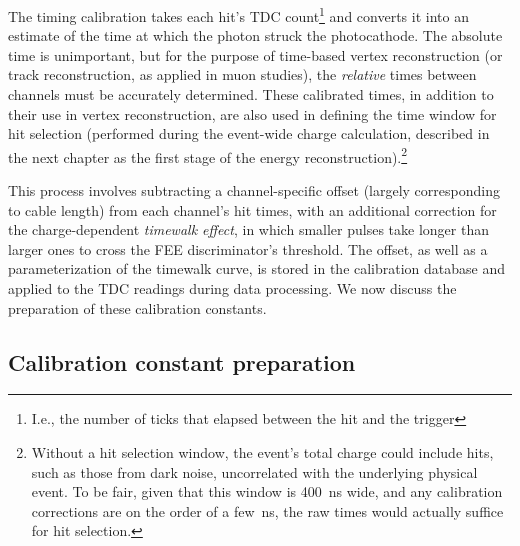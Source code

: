 \documentclass[../thesis.tex]{subfiles}
\begin{document}
The timing calibration takes each hit's TDC count\footnote{I.e., the number of ticks that elapsed between the hit and the trigger} and converts it into an estimate of the time at which the photon struck the photocathode. The absolute time is unimportant, but for the purpose of time-based vertex reconstruction (or track reconstruction, as applied in muon studies), the \emph{relative} times between channels must be accurately determined. These calibrated times, in addition to their use in vertex reconstruction, are also used in defining the time window for hit selection (performed during the event-wide charge calculation, described in the next chapter as the first stage of the energy reconstruction).\footnote{Without a hit selection window, the event's total charge could include hits, such as those from dark noise, uncorrelated with the underlying physical event. To be fair, given that this window is 400~ns wide, and any calibration corrections are on the order of a few~ns, the raw times would actually suffice for hit selection.}

This process involves subtracting a channel-specific offset (largely corresponding to cable length) from each channel's hit times, with an additional correction for the charge-dependent \emph{timewalk effect}, in which smaller pulses take longer than larger ones to cross the FEE discriminator's threshold. The offset, as well as a parameterization of the timewalk curve, is stored in the calibration database and applied to the TDC readings during data processing. We now discuss the preparation of these calibration constants.

\subsection{Calibration constant preparation}
\end{document}
